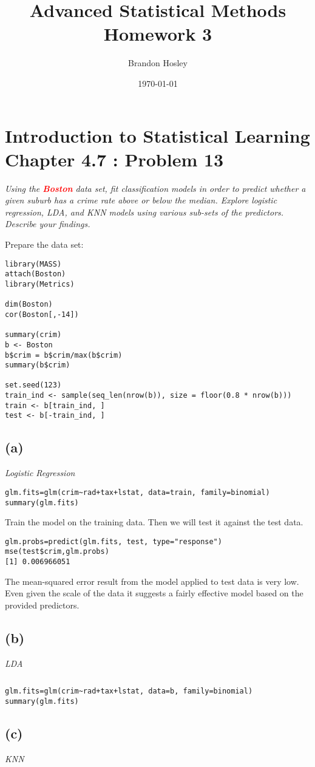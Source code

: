 \documentclass[a4paper,man,natbib]{apa6}
\title{Advanced Statistical Methods Homework 3}
\author{Brandon Hosley}
\date{\today}
\affiliation{University of Illinois - Springfield}
\begin{document}
\maketitle
\singlespacing

\section{Introduction to Statistical Learning \\ Chapter 4.7 : Problem 13}
\emph{
Using the \textbf{\textcolor{red}{Boston}} data set, 
fit classification models in order to predict
whether a given suburb has a crime rate above or below the median.
Explore logistic regression, LDA, and KNN models using various sub-sets of the predictors. Describe your findings.}

Prepare the data set:

\begin{verbatim}
library(MASS)
attach(Boston)
library(Metrics)

dim(Boston)
cor(Boston[,-14])

summary(crim)
b <- Boston
b$crim = b$crim/max(b$crim)
summary(b$crim)

set.seed(123)
train_ind <- sample(seq_len(nrow(b)), size = floor(0.8 * nrow(b)))
train <- b[train_ind, ]
test <- b[-train_ind, ]
\end{verbatim}

\subsection{(a)} 
\emph{Logistic Regression}
\begin{verbatim}
glm.fits=glm(crim~rad+tax+lstat, data=train, family=binomial)
summary(glm.fits)
\end{verbatim}

Train the model on the training data. Then we will test it against the test data.

\begin{verbatim}
glm.probs=predict(glm.fits, test, type="response")
mse(test$crim,glm.probs)
[1] 0.006966051
\end{verbatim}

The mean-squared error result from the model applied to test data is very low.
Even given the scale of the data it suggests a fairly effective model based on the provided predictors.

\subsection{(b)}
\emph{LDA}
\begin{verbatim}
\end{verbatim}

\begin{verbatim}
glm.fits=glm(crim~rad+tax+lstat, data=b, family=binomial)
summary(glm.fits)
\end{verbatim}

\subsection{(c)}
\emph{KNN}
\begin{verbatim}
\end{verbatim}
	
\end{document}
